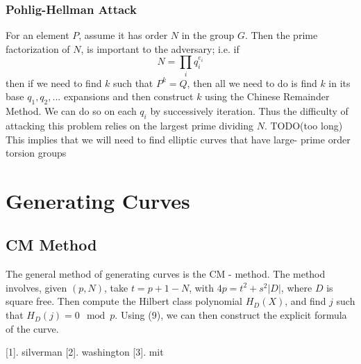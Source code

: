 \documentclass[12pt,twoside]{article}
\begin{document}
\subsubsection{Pohlig-Hellman Attack}
For an element $P$, assume it has order $N$ in the group $G$. Then the prime factorization of $N$, is important to the adversary; i.e. if 
$$ N = \prod_{i}q_{i}^{e_{i}} $$ then if we need to find $k$ such that $P^{k} = Q$, then all we need to do is find $k$ in its base $q_{1}, q_{2},...$ expansions and then construct $k$ using the Chinese Remainder Method. We can do so on each $q_{i}$ by successively iteration. Thus the difficulty of attacking this problem relies on the largest prime dividing $N$. TODO(too long) \\ 

This implies that we will need to find elliptic curves that have large- prime order torsion groups




\section{Generating Curves} 

\subsection{CM Method} 
The general method of generating curves is the CM - method. 
The method involves, given $(p, N)$,  take $t = p+1 - N$, with $4p = t^{2} + s^{2}|D|$, where $D$ is square free. Then compute the Hilbert class polynomial $H_{D}(X)$, and find $j$ such that $H_{D}(j) = 0 \mod p$. Using (9), we can then construct the explicit formula of the curve.   










 

[1]. silverman
[2]. washington
[3]. mit
\end{document}
